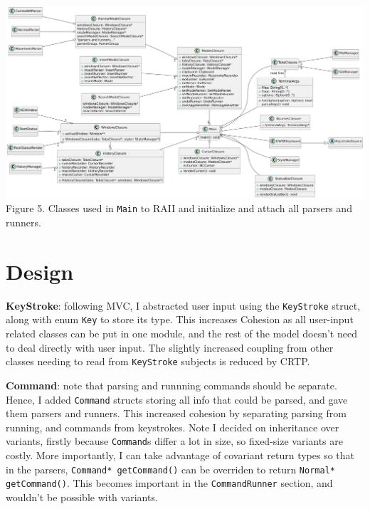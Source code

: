\documentclass{article}
\begin{document}
\\\includegraphics[width=\textwidth]{uml9}
Figure 5. Classes used in \texttt{Main} to RAII and initialize and attach 
all parsers and runners. 

\section{Design} 
\textbf{KeyStroke}: following MVC, I abstracted user input using  
the \texttt{KeyStroke} struct, along with enum \texttt{Key} to store its type. 
This increases Cohesion as all user-input related 
classes can be put in one module, and the rest of the model 
doesn't need to deal directly with user input. 
The slightly increased coupling from other classes needing to read from 
\texttt{KeyStroke} subjects is reduced by CRTP. 

\textbf{Command}: note that parsing and runnning commands should be separate. 
Hence, I added \texttt{Command} structs storing all info that could be parsed, 
and gave them parsers and runners. 
This increased cohesion by separating parsing from running, and commands from keystrokes. 
Note I decided on inheritance over variants, 
firstly because \texttt{Command}s differ a lot in size, so fixed-size variants 
are costly. More importantly, I can take advantage of covariant return types
so that in the parsers, \texttt{Command* getCommand()} can be overriden 
to return \texttt{Normal* getCommand()}. 
This becomes important in the \texttt{CommandRunner} section, 
and wouldn't be possible with variants. 
\end{document}
